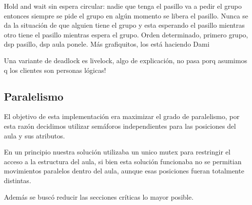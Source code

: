 Hold and wait sin espera circular: nadie que tenga el pasillo va a pedir el grupo entonces siempre se pide el grupo en algún momento se libera el pasillo.
Nunca se da la situación de que alguien tiene el grupo y esta esperando el pasillo mientras otro tiene el pasillo mientras espera el grupo.
Orden determinado, primero grupo, dsp pasillo, dsp aula ponele.
Más grafiquitos, los está haciendo Dami

Una variante de deadlock es livelock, algo de explicación, no pasa porq asumimos q los clientes son personas lógicas!

\subsection{Paralelismo}
El objetivo de esta implementación era maximizar el grado de paralelismo, por esta razón decidimos utilizar semáforos independientes para las posiciones
del aula y sus atributos.

En un principio nuestra solución utilizaba un unico mutex para restringir el acceso a la estructura del aula, si bien esta solución funcionaba
no se permitian movimientos paralelos dentro del aula, aunque esas posiciones fueran totalmente distintas.

Además se buscó reducir las secciones críticas lo mayor posible.

